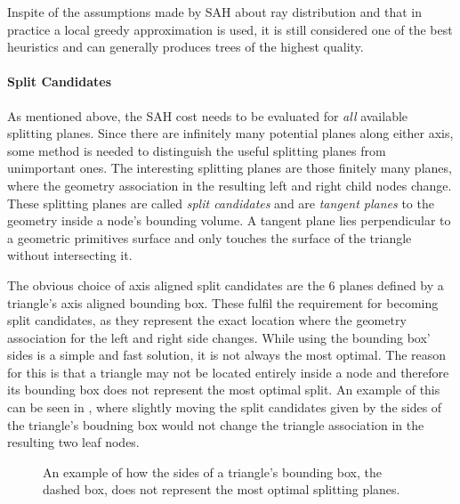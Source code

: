 Inspite of the assumptions made by SAH about ray distribution and that in
practice a local greedy approximation is used, it is still considered one of the
best heuristics and can generally produces trees of the highest quality.



\paragraph{Split Candidates}


As mentioned above, the SAH cost needs to be evaluated for \textit{all}
available splitting planes. Since there are infinitely many potential planes
along either axis, some method is needed to distinguish the useful splitting
planes from unimportant ones. The interesting splitting planes are those
finitely many planes, where the geometry association in the resulting left and
right child nodes change. These splitting planes are called \textit{split
  candidates} and are \textit{tangent planes} to the geometry inside a node's
bounding volume. A tangent plane lies perpendicular to a geometric primitives
surface and only touches the surface of the triangle without intersecting it.


The obvious choice of axis aligned split candidates are the 6 planes defined by
a triangle's axis aligned bounding box. These fulfil the requirement for
becoming split candidates, as they represent the exact location where the
geometry association for the left and right side changes. While using the
bounding box' sides is a simple and fast solution, it is not always the most
optimal. The reason for this is that a triangle may not be located entirely
inside a node and therefore its bounding box does not represent the most optimal
split. An example of this can be seen in , where slightly
moving the split candidates given by the sides of the triangle's boudning box
would not change the triangle association in the resulting two leaf nodes.

\begin{figure}
  \centering

  \vspace{3mm}
  \parbox{5cm}{\caption[Triangle/Node bounding box intersection.]{An
      example of how the sides of a triangle's bounding box, the
      dashed box, does not represent the most optimal splitting
      planes.}\label{fig:aabbSplit}}
\end{figure}

